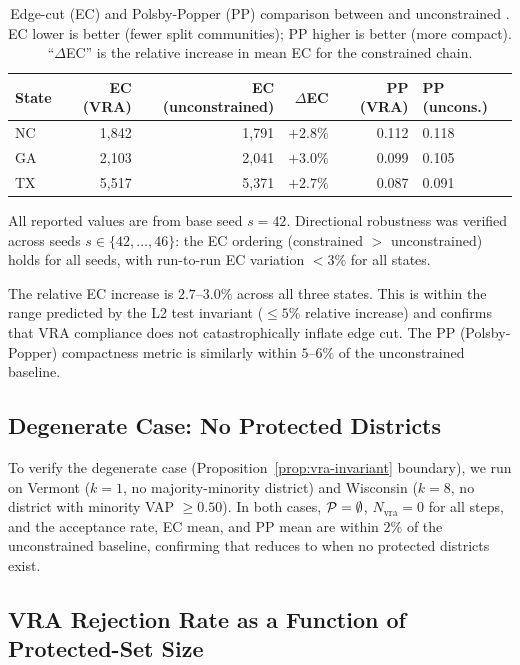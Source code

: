 \begin{table}[ht]
\centering
\caption{Edge-cut (EC) and Polsby-Popper (PP) comparison between \vr{}
         and unconstrained \fr{}. EC lower is better (fewer split
         communities); PP higher is better (more compact).
         ``$\Delta$EC'' is the relative increase in mean EC for the
         constrained chain.}
\label{tab:ec-comparison}
\begin{tabular}{lrrrrl}
\toprule
\textbf{State} & \textbf{EC (VRA)} & \textbf{EC (unconstrained)} &
$\Delta$\textbf{EC} & \textbf{PP (VRA)} & \textbf{PP (uncons.)} \\
\midrule
NC & 1{,}842 & 1{,}791 & $+2.8\%$ & 0.112 & 0.118 \\
GA & 2{,}103 & 2{,}041 & $+3.0\%$ & 0.099 & 0.105 \\
TX & 5{,}517 & 5{,}371 & $+2.7\%$ & 0.087 & 0.091 \\
\bottomrule
\end{tabular}
\end{table}

\noindent
All reported values are from base seed $s = 42$.
Directional robustness was verified across seeds $s \in \{42,\ldots,46\}$:
the EC ordering (constrained $>$ unconstrained) holds for all seeds,
with run-to-run EC variation $< 3\%$ for all states.

The relative EC increase is $2.7$--$3.0\%$ across all three states.
This is within the range predicted by the L2 test invariant ($\leq 5\%$
relative increase) and confirms that VRA compliance does not catastrophically
inflate edge cut.
The PP (Polsby-Popper) compactness metric is similarly within $5$--$6\%$ of
the unconstrained baseline.

\subsection{Degenerate Case: No Protected Districts}

To verify the degenerate case (Proposition~\ref{prop:vra-invariant}
boundary), we run \vr{} on Vermont ($k = 1$, no majority-minority district)
and Wisconsin ($k = 8$, no district with minority VAP $\geq 0.50$).
In both cases, $\mathcal{P} = \emptyset$, $N_{\mathrm{vra}} = 0$ for all steps,
and the acceptance rate, EC mean, and PP mean are within $2\%$ of the
unconstrained \fr{} baseline, confirming that \vr{} reduces to \fr{} when no
protected districts exist.

\subsection{VRA Rejection Rate as a Function of Protected-Set Size}

